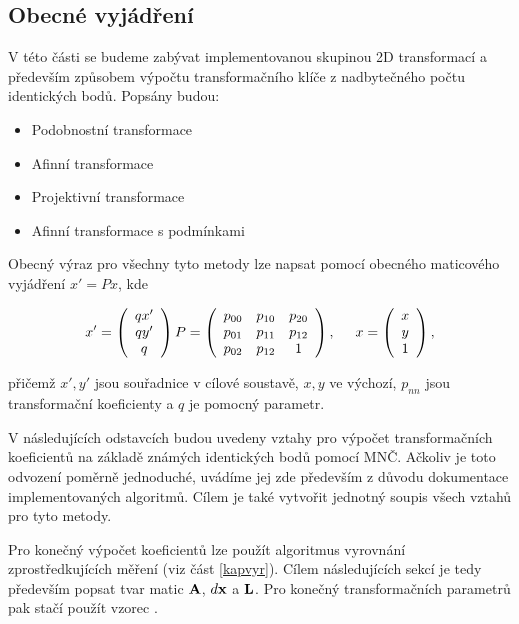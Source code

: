 \subsection{Obecné vyjádření}

V této části se budeme zabývat implementovanou skupinou 2D transformací a
především způsobem výpočtu transformačního klíče z nadbytečného počtu
identických bodů. Popsány budou:

\begin{itemize}
  \item Podobnostní transformace
  \item Afinní transformace
  \item Projektivní transformace
  \item Afinní transformace s podmínkami
\end{itemize}

Obecný výraz pro všechny tyto metody lze napsat pomocí obecného maticového
vyjádření $x' = P x$, kde

$$ x' = \left(
\begin{array}{ccc}
qx'\\
qy'\\ 
q\\
\end{array}
\right) 
P = \left(
\begin{array}{ccc}
p_{00}  &   p_{10}  &   p_{20}  \\
p_{01}  &   p_{11}  &   p_{12} \\
p_{02} &    p_{12}  &    1                                
\end{array}
 \right),
  \hspace{0.5 cm} 
 x = 
 \left(
\begin{array}{ccc}
x\\
y\\ 
1\\
\end{array}
\right) ,$$ 

přičemž $x', y'$ jsou souřadnice v cílové soustavě, $x, y$ ve výchozí, 
$p_{nn}$  jsou transformační koeficienty a $q$ je pomocný parametr.

V následujících odstavcích budou uvedeny vztahy pro výpočet
transformačních koeficientů na základě známých identických bodů pomocí MNČ.
Ačkoliv je toto odvození poměrně jednoduché, uvádíme jej zde především z důvodu
dokumentace implementovaných algoritmů. Cílem je také vytvořit jednotný soupis
všech vztahů pro tyto metody.

Pro konečný výpočet koeficientů lze použít algoritmus vyrovnání
zprostředkujících měření (viz část \ref{kapvyr}). Cílem následujících sekcí
je tedy především popsat tvar matic ${\bf A}$, $d{\bf x}$ a ${\bf L}$. Pro konečný
transformačních parametrů pak stačí použít vzorec \label{ata}.

